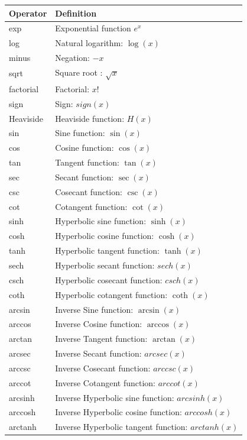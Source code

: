 \begin{table}[ht!]
\begin{center}
\small
\begin{tabular}{ll}\toprule
Operator & Definition \\\midrule
exp & Exponential function $e^x$ \\
log & Natural logarithm: $\log(x)$ \\
minus & Negation: $-x$\\
sqrt & Square root : $\sqrt{x}$\\
factorial & Factorial: $x!$\\
sign & Sign: $sign(x)$\\
Heaviside & Heaviside function: $H(x)$\\
sin & Sine function: $\sin(x)$\\
cos & Cosine function: $\cos(x)$\\
tan & Tangent function: $\tan(x)$\\
sec & Secant function: $\sec(x)$\\
csc & Cosecant function: $\csc(x)$\\
cot & Cotangent function: $\cot(x)$\\
 sinh & Hyperbolic sine function: $\sinh(x)$\\
cosh & Hyperbolic cosine function: $\cosh(x)$\\
tanh & Hyperbolic tangent function: $\tanh(x)$\\
sech & Hyperbolic secant function: $sech(x)$\\
csch & Hyperbolic cosecant function: $csch(x)$\\
coth & Hyperbolic cotangent function: $\coth(x)$\\
arcsin & Inverse Sine function: $\arcsin(x)$\\
arccos & Inverse  Cosine function: $\arccos(x)$\\
arctan & Inverse  Tangent function: $\arctan(x)$\\
arcsec & Inverse  Secant function: $arcsec(x)$\\
arccsc & Inverse  Cosecant function: $arccsc(x)$\\
arccot & Inverse  Cotangent function: $arccot(x)$\\
arcsinh & Inverse  Hyperbolic sine function: $arcsinh(x)$\\
arccosh & Inverse  Hyperbolic cosine function: $arccosh(x)$\\
arctanh & Inverse  Hyperbolic tangent function: $arctanh(x)$\\

\end{tabular}
\end{center}
\end{table}
